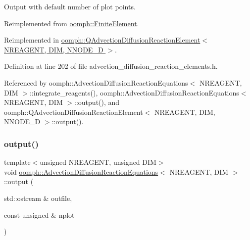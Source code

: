 Output with default number of plot points. 



Reimplemented from \hyperlink{classoomph_1_1FiniteElement_a2ad98a3d2ef4999f1bef62c0ff13f2a7}{oomph\+::\+Finite\+Element}.



Reimplemented in \hyperlink{classoomph_1_1QAdvectionDiffusionReactionElement_abea67b1715ee4b70086ee68dcddbc0b1}{oomph\+::\+Q\+Advection\+Diffusion\+Reaction\+Element$<$ N\+R\+E\+A\+G\+E\+N\+T, D\+I\+M, N\+N\+O\+D\+E\+\_\+D $>$}.



Definition at line 202 of file advection\+\_\+diffusion\+\_\+reaction\+\_\+elements.\+h.



Referenced by oomph\+::\+Advection\+Diffusion\+Reaction\+Equations$<$ N\+R\+E\+A\+G\+E\+N\+T, D\+I\+M $>$\+::integrate\+\_\+reagents(), oomph\+::\+Advection\+Diffusion\+Reaction\+Equations$<$ N\+R\+E\+A\+G\+E\+N\+T, D\+I\+M $>$\+::output(), and oomph\+::\+Q\+Advection\+Diffusion\+Reaction\+Element$<$ N\+R\+E\+A\+G\+E\+N\+T, D\+I\+M, N\+N\+O\+D\+E\+\_\+D $>$\+::output().

\mbox{\label{classoomph_1_1AdvectionDiffusionReactionEquations_a38aa99ed50cc082f0c9c7079a13a11da}} 
\subsubsection{\texorpdfstring{output()}{output()}\hspace{0.1cm}{\footnotesize\ttfamily [2/4]}}
{\footnotesize\ttfamily template$<$unsigned N\+R\+E\+A\+G\+E\+NT, unsigned D\+IM$>$ \\
void \hyperlink{classoomph_1_1AdvectionDiffusionReactionEquations}{oomph\+::\+Advection\+Diffusion\+Reaction\+Equations}$<$ N\+R\+E\+A\+G\+E\+NT, D\+IM $>$\+::output (\begin{DoxyParamCaption}\item[{std\+::ostream \&}]{outfile,  }\item[{const unsigned \&}]{nplot }\end{DoxyParamCaption})\hspace{0.3cm}{\ttfamily [virtual]}}



